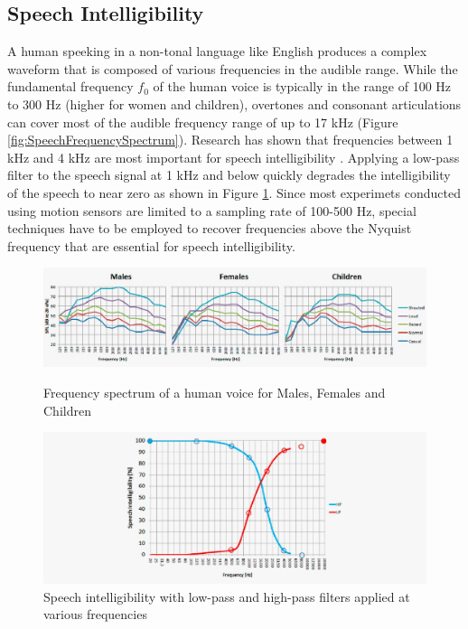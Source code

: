 \documentclass[sigconf, nonacm]{acmart}
\begin{document}
\subsection{Speech Intelligibility}
A human speeking in a non-tonal language like English produces a complex waveform that is composed of various frequencies in the audible range.
While the fundamental frequency $f_0$ of the human voice is typically in the range of 100 Hz to 300 Hz (higher for women and children), overtones and consonant articulations can cover most of the audible frequency range of up to 17 kHz (Figure \ref{fig:SpeechFrequencySpectrum}).
Research has shown that frequencies between 1 kHz and 4 kHz are most important for speech intelligibility \cite{DPAMicrophonesFactsAboutSpeechIntelligibility}.
Applying a low-pass filter to the speech signal at 1 kHz and below quickly degrades the intelligibility of the speech to near zero as shown in Figure \ref{fig:SpeechIntelligibility}.
Since most experimets conducted using motion sensors are limited to a sampling rate of 100-500 Hz, special techniques have to be employed to recover frequencies above the Nyquist frequency that are essential for speech intelligibility.

\begin{figure}[h]
  \centering
  \includegraphics[width=\linewidth]{embed/Speech_frequency_spectrum.jpg}
  \caption{Frequency spectrum of a human voice for Males, Females and Children \cite{DPAMicrophonesFactsAboutSpeechIntelligibility}}
  \label{fig:SpeechFrequencySpectrum}

  \vspace{0.5cm}

  \includegraphics[width=\linewidth]{embed/Speech_Intelligibility_Low_High_Pass_Filter.jpg}
  \caption{Speech intelligibility with low-pass and high-pass filters applied at various frequencies \cite{DPAMicrophonesFactsAboutSpeechIntelligibility}}
  \label{fig:SpeechIntelligibility}
\end{figure}
\end{document}
